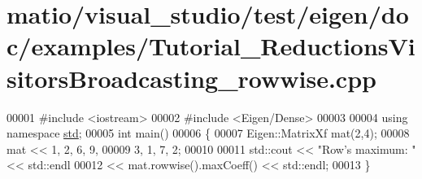 \hypertarget{matio_2visual__studio_2test_2eigen_2doc_2examples_2_tutorial___reductions_visitors_broadcasting__rowwise_8cpp_source}{}\section{matio/visual\+\_\+studio/test/eigen/doc/examples/\+Tutorial\+\_\+\+Reductions\+Visitors\+Broadcasting\+\_\+rowwise.cpp}
\label{matio_2visual__studio_2test_2eigen_2doc_2examples_2_tutorial___reductions_visitors_broadcasting__rowwise_8cpp_source}

\begin{DoxyCode}
00001 \textcolor{preprocessor}{#include <iostream>}
00002 \textcolor{preprocessor}{#include <Eigen/Dense>}
00003 
00004 \textcolor{keyword}{using namespace }\hyperlink{namespacestd}{std};
00005 \textcolor{keywordtype}{int} main()
00006 \{
00007   Eigen::MatrixXf mat(2,4);
00008   mat << 1, 2, 6, 9,
00009          3, 1, 7, 2;
00010   
00011   std::cout << \textcolor{stringliteral}{"Row's maximum: "} << std::endl
00012    << mat.rowwise().maxCoeff() << std::endl;
00013 \}
\end{DoxyCode}
